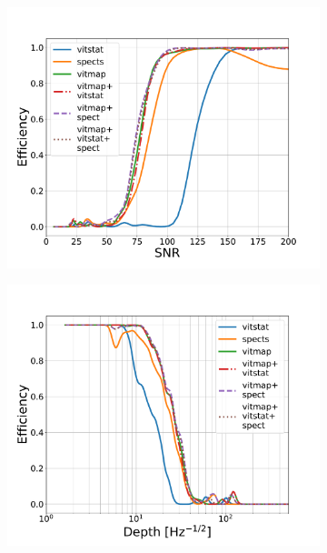 \begin{figure}[h]
	\begin{subfigure}[h]{0.5\textwidth}
		\includegraphics[width=\columnwidth]{C4_cnn/o2_snr_eff.pdf}
		\caption{}
		\label{machine:results:snr_o2}
	\end{subfigure}
	\begin{subfigure}[h]{0.5\textwidth}
		\includegraphics[width=\columnwidth]{C4_cnn/o2_depth_eff.pdf}
		\caption{}
		\label{machine:results:depth_o2}
	\end{subfigure}


\end{figure}
